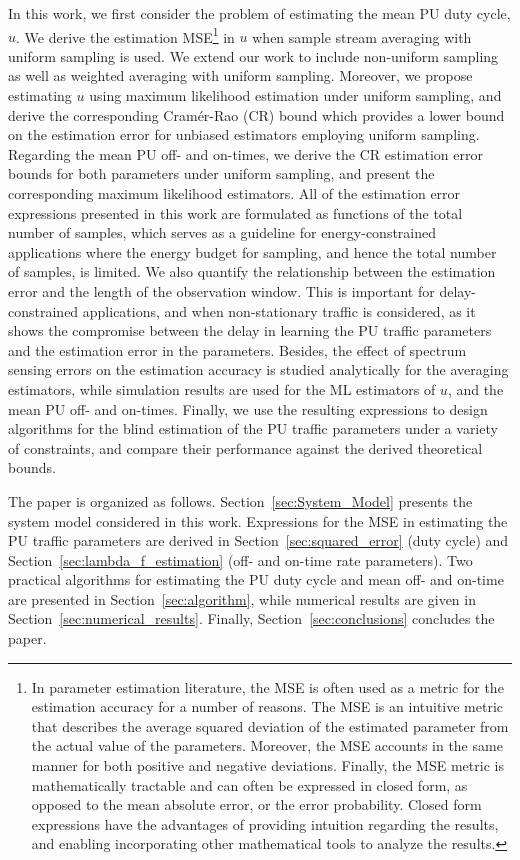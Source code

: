 \documentclass[11pt,draftclsnofoot,journal,onecolumn]{IEEEtran}
\begin{document}
In this work, we first consider the problem of estimating the mean PU duty cycle, $u$. We derive the estimation MSE\footnote{In parameter estimation literature, the MSE is often used as a metric for the estimation accuracy for a number of reasons. The MSE is an intuitive metric that describes the average squared deviation of the estimated parameter from the actual value of the parameters. Moreover, the MSE accounts in the same manner for both positive and negative deviations. Finally, the MSE metric is mathematically tractable and can often be expressed in closed form, as opposed to the mean absolute error, or the error probability. Closed form expressions have the advantages of providing intuition regarding the results, and enabling incorporating other mathematical tools to analyze the results.} in $u$ when sample stream averaging with uniform sampling is used. We extend our work to include non-uniform sampling as well as weighted averaging with uniform sampling. Moreover, we propose estimating $u$ using maximum likelihood estimation under uniform sampling, and derive the corresponding Cram\'{e}r-Rao (CR) bound which provides a lower bound on the estimation error for unbiased estimators employing uniform sampling. Regarding the mean PU off- and on-times, we derive the CR estimation error bounds for both parameters under uniform sampling, and present the corresponding maximum likelihood estimators. All of the estimation error expressions presented in this work are formulated as functions of the total number of samples, which serves as a guideline for energy-constrained applications where the energy budget for sampling, and hence the total number of samples, is limited. We also quantify the relationship between the estimation error and the length of the observation window. This is important for delay-constrained applications, and when non-stationary traffic is considered, as it shows the compromise between the delay in learning the PU traffic parameters and the estimation error in the parameters. Besides, the effect of spectrum sensing errors on the estimation accuracy is studied analytically for the averaging estimators, while simulation results are used for the ML estimators of $u$, and the mean PU off- and on-times. Finally, we use the resulting expressions to design algorithms for the blind estimation of the PU traffic parameters under a variety of constraints, and compare their performance against the derived theoretical bounds.

The paper is organized as follows. Section~\ref{sec:System_Model} presents the system model considered in this work. Expressions for the MSE in estimating the PU traffic parameters are derived in Section~\ref{sec:squared_error} (duty cycle) and Section~\ref{sec:lambda_f_estimation} (off- and on-time rate parameters). Two practical algorithms for estimating the PU duty cycle and mean off- and on-time are presented in Section~\ref{sec:algorithm}, while numerical results are given in Section~\ref{sec:numerical_results}. Finally, Section~\ref{sec:conclusions} concludes the paper.
\end{document}
